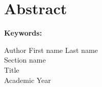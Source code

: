 \chapter*{Abstract}


\textbf{Keywords:}


\vspace*{\fill}
\noindent Author First name Last name\\
Section name\\
Title\\
Academic Year
